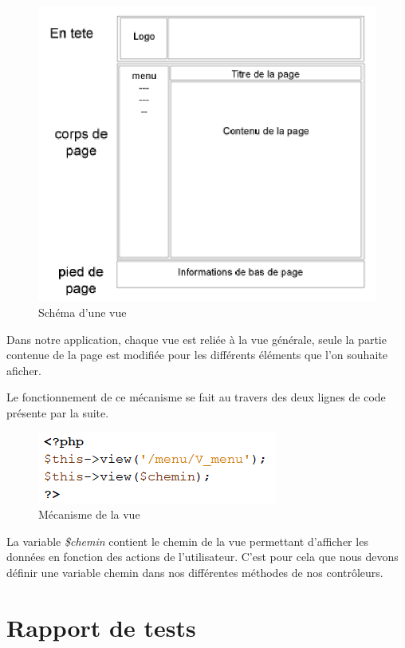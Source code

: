 \documentclass{polytech/polytech}
\begin{document}
\begin{figure}
	\includegraphics[scale=0.7]{images/schemaVue}
	\caption{Schéma d'une vue}
	\label{fig:schemaVues}
\end{figure}

Dans notre application, chaque vue est reliée à la vue générale, seule la partie contenue de la page est modifiée pour les différents éléments que l'on souhaite aficher. 

Le fonctionnement de ce mécanisme se fait au travers des deux lignes de code présente par la suite.

\begin{figure}
	\includegraphics[scale=1]{images/vue}
	\caption{Mécanisme de la vue}
	\label{fig:vue}
\end{figure}

La variable \textit{\$chemin} contient le chemin de la vue permettant d’afficher les données en fonction des actions de l'utilisateur. C'est pour cela que nous devons définir une variable chemin dans nos différentes méthodes de nos contrôleurs. 

\chapter{Rapport de tests}
\end{document}
